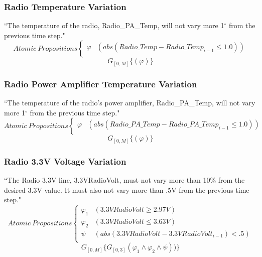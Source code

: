 \documentclass[conf]{new-aiaa}
\begin{document}
\setcounter{subsubsection}{4}

\subsubsection{\textbf{Radio Temperature Variation}}
“The temperature of the radio, Radio\_PA\_Temp, will not vary more 1$^{\circ}$ from the previous time step."
\[ Atomic\:Propositions \begin{cases}
  \varphi & (abs(Radio\_Temp - Radio\_Temp_{i-1} \leq 1.0)) \\
\end{cases} \]
\begin{equation}
    \label{Spec 5}
    G_{[0,M]} \{(\varphi)\}
\end{equation} 

\subsubsection{\textbf{Radio Power Amplifier Temperature Variation}}
“The temperature of the radio's power amplifier, Radio\_PA\_Temp, will not vary more 1$^{\circ}$ from the previous time step."
\[ Atomic\:Propositions \begin{cases}
  \varphi & (abs(Radio\_PA\_Temp - Radio\_PA\_Temp_{i-1} \leq 1.0)) \\
\end{cases} \]
\begin{equation}
    \label{Spec 6}
    G_{[0,M]} \{(\varphi)\}
\end{equation} 

\subsubsection{\textbf{Radio 3.3V Voltage Variation}}
\label{rvv}
“The Radio 3.3V line, 3.3VRadioVolt, must not vary more than 10\% from the desired 3.3V value. It must also not vary more than .5V from the previous time step."
\[ Atomic\:Propositions \begin{cases}
  \varphi_1 & (3.3VRadioVolt \geq 2.97V) \\
  \varphi_2 & (3.3VRadioVolt \leq 3.63V) \\
  \psi & (abs(3.3VRadioVolt - 3.3VRadioVolt_{i-1}) < .5)\\
\end{cases} \]
\begin{equation}
    \label{Spec 7}
    G_{[0,M]} \{G_{[0,3]}(\varphi_1 \wedge \varphi_2 \wedge \psi))\}
\end{equation} 
\end{document}
